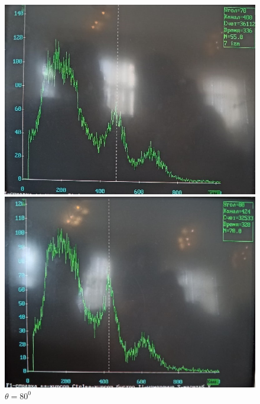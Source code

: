 \documentclass[a4paper, 12pt]{article}%
\begin{document}
\begin{figure}[h]
\begin{minipage}[h]{0.3\linewidth}
\includegraphics[width = 1\linewidth]{10.jpg}
\caption{$\theta = 70^0$}
\end{minipage}
\hfill
\begin{minipage}[h]{0.3\linewidth}
\includegraphics[width = 1\linewidth]{11.jpg}
\caption{$\theta = 80^0$}
\end{minipage}
\hfill
\begin{minipage}[h]{0.3\linewidth}

\end{minipage}
\end{figure}
\end{document}
